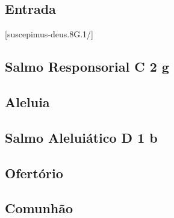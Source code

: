 
\subsection{Entrada}\label{subsection:tempus-per-annum/missa-4/introitus}
[suscepimus-deus.8G.1/]

\AllowPageFlush

\subsection[Salmo Responsorial]{Salmo Responsorial \textmd{C 2 g}}\label{subsection:tempus-per-annum/missa-4/psalmus-responsorius}

\subsection{Aleluia}\label{subsection:tempus-per-annum/missa-4/alleluia}

\AllowPageFlush

\subsection[Salmo Aleluiático]{Salmo Aleluiático \textmd{D 1 b}}\label{subsection:tempus-per-annum/missa-4/psalmus-alleluiaticus}

\AllowPageFlush

\subsection{Ofertório}\label{subsection:tempus-per-annum/missa-4/offertorium}

\AllowPageFlush

\subsection{Comunhão}\label{subsection:tempus-per-annum/missa-4/communio}
